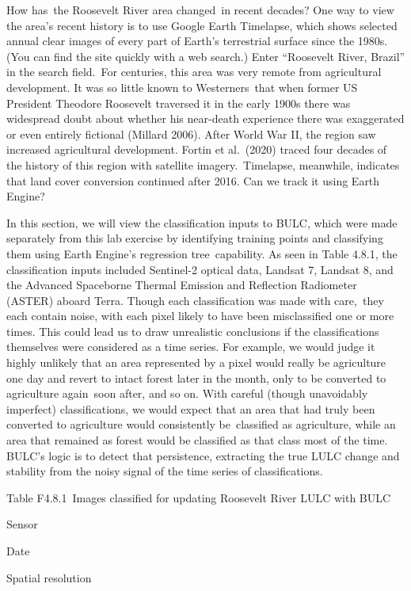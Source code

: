 \documentclass[
  letterpaper,
  DIV=11,
  numbers=noendperiod]{scrreprt}
\begin{document}
How has~the Roosevelt River area changed~in recent decades? One way to
view the area's recent history is to use Google Earth Timelapse, which
shows selected annual clear images of every part of Earth's terrestrial
surface since the 1980s. (You can find the site quickly with a web
search.) Enter ``Roosevelt River, Brazil'' in the search field.~For
centuries, this area was very remote from agricultural development. It
was so little known to Westerners~that when former US President Theodore
Roosevelt traversed it in the early 1900s there was widespread doubt
about whether his near-death experience there was exaggerated or even
entirely fictional (Millard 2006). After World War II, the region saw
increased agricultural development. Fortin et al.~(2020) traced four
decades of the history of this region with satellite imagery.~Timelapse,
meanwhile, indicates that land cover conversion continued after 2016.
Can we track it using Earth Engine?

In this section, we will view the classification inputs to BULC, which
were made separately from this lab exercise by identifying training
points and classifying them using Earth Engine's regression
tree~capability. As seen in Table 4.8.1, the classification inputs
included Sentinel-2 optical data, Landsat 7, Landsat 8, and the Advanced
Spaceborne Thermal Emission and Reflection Radiometer (ASTER) aboard
Terra. Though each classification was made with care,~they each contain
noise, with each pixel likely to have been misclassified one or more
times. This could lead us to draw unrealistic conclusions if the
classifications themselves were considered as a time series. For
example, we would judge it highly unlikely that an area represented by a
pixel would really be agriculture one day and revert to intact forest
later in the month, only to be converted to agriculture again~soon
after, and so on. With careful (though unavoidably imperfect)
classifications, we would expect that an area that had truly been
converted to agriculture would consistently be~classified as
agriculture, while an area that remained as forest would be classified
as that class most of the time. BULC's logic is to detect that
persistence, extracting the true LULC change and stability from the
noisy signal of the time series of classifications.

Table F4.8.1~Images classified for updating Roosevelt River LULC with
BULC

Sensor

Date

Spatial resolution
\end{document}
